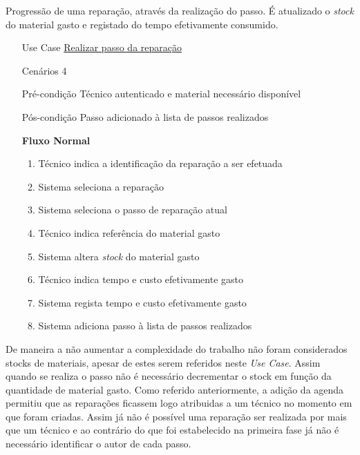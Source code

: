 \documentclass[../relatorio.tex]{subfiles}
\begin{document}
Progressão de uma reparação, através da realização do passo.
É atualizado o \textit{stock} do material gasto e registado do tempo efetivamente consumido.
\begin{itemize}
    \item[Use Case] {\underline{Realizar passo da reparação}}
    \item[Cenários] {4}
    \item[Pré-condição] {Técnico autenticado e material necessário disponível}
    \item[Pós-condição] {Passo adicionado à lista de passos realizados}
          \begin{flushleft}
              \textbf{Fluxo Normal}
          \end{flushleft}
          \begin{enumerate}
              \item Técnico indica a identificação da reparação a ser efetuada 
              \item Sistema seleciona a reparação
              \item Sistema seleciona o passo de reparação atual
              \item Técnico indica referência do material gasto
              \item Sistema altera \textit{stock} do material gasto
              \item Técnico indica tempo e custo efetivamente gasto 
              \item Sistema regista tempo e custo efetivamente gasto
              \item Sistema adiciona passo à lista de passos realizados
          \end{enumerate}
\end{itemize}

De maneira a não aumentar a complexidade do trabalho não foram considerados stocks de materiais, apesar de estes serem referidos neste \textit{Use Case}.
Assim quando se realiza o passo não é necessário decrementar o stock em função da quantidade de material gasto.
Como referido anteriormente, a adição da agenda permitiu que as reparações ficassem logo atribuidas a um técnico no momento em que foram criadas. Assim
já não é possível uma reparação ser realizada por mais que um técnico e ao contrário do que foi estabelecido na primeira fase já não é necessário identificar 
o autor de cada passo.
\end{document}
